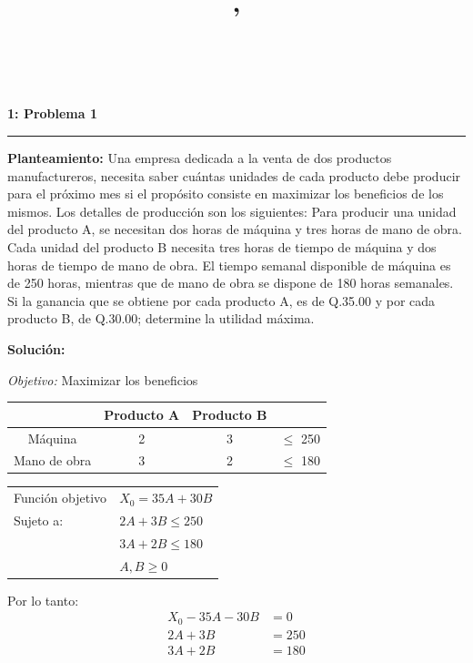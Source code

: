 \documentclass[11pt]{article}
\author{\textbf{\hmwkNombreAutor}\\ \textbf{ \vspace{0.1in}\hmwkAuthorID}}
\date{\hmwkFechaEntrega}
\title{
	\textbf{\hmwkUniversidad} \\
	\hmwkFacultad \\
	\vspace{0.1in}\hmwkSede\\
    \vspace{2.5in}
    \textmd{\textbf{\hmwkTitulo}}\\
    \vspace{0.1in}\large{\hmwkCurso , \textit{\hmwkCursoInstructor }}
    \vspace{2.5in}
}
\newcommand\problema[2]{\vspace{.01in}\textbf{#1: #2}\vspace{.5em}\hrule\vspace{.10in}}
\newcommand\planteamiento{\vspace{.10in}\textbf{Planteamiento: }}
\newcommand\solucion{\vspace{.10in}\textbf{Solución: }}
\newcommand\obj{\vspace{.10in}\textit{Objetivo: }}
\begin{document}
\maketitle
\pagebreak

\problema{1}{Problema 1}

\planteamiento Una empresa dedicada a la venta de dos productos manufactureros, necesita saber cuántas unidades de cada producto debe producir para el próximo mes si el propósito consiste en maximizar los beneficios de los mismos. Los detalles de producción son los siguientes: Para producir una unidad del producto A, se necesitan dos horas de máquina y tres horas de mano de obra. Cada unidad del producto B necesita tres horas de tiempo de máquina y dos horas de tiempo de mano de obra. El tiempo semanal disponible de máquina es de 250 horas, mientras que de mano de obra se dispone de 180 horas semanales. Si la ganancia que se obtiene por cada producto A, es de Q.35.00 y por cada producto B, de Q.30.00; determine la utilidad máxima.

\solucion

\obj Maximizar los beneficios\\
\begin{tabular}{|c|c|c|c|}
\hline 
 & Producto A & Producto B &  \\ 
\hline 
Máquina & 2 & 3 & $\leq$ 250 \\ 
\hline 
Mano de obra & 3 & 2 & $\leq$ 180 \\ 
\hline 
\end{tabular}


\begin{table}[h]
\begin{tabular}{ll}
Función objetivo & $X_0=35A+30B$    \\
Sujeto a:        & $2A+3B \leq 250$ \\
                 & $3A+2B \leq 180$ \\
                 & $A,B \geq 0$    
\end{tabular}
\end{table}
Por lo tanto:
\begin{align*}
X_0-35A-30B &=0\\
2A+3B &=250\\
3A+2B &=180
\end{align*}
\end{document}
